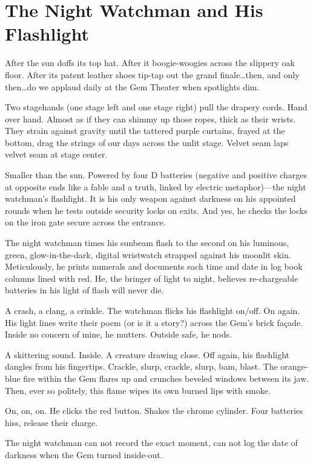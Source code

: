 \documentclass[twoside,10pt]{book}
\begin{document}
\clearpage
\section{The Night Watchman and His Flashlight}

After the sun doffs its top hat. After it boogie-woogies across the
slippery oak floor. After its patent leather shoes tip-tap out the grand
finale\ldots then, and only then\ldots do we applaud daily at the Gem
Theater when spotlights dim.

Two stagehands (one stage left and one stage right) pull the drapery
cords. Hand over hand. Almost as if they can shimmy up those ropes,
thick as their wrists. They strain against gravity until the tattered
purple curtains, frayed at the bottom, drag the strings of our days
across the unlit stage. Velvet seam laps velvet seam at stage center.

Smaller than the sun. Powered by four D batteries (negative and positive
charges at opposite ends like a fable and a truth, linked by electric
metaphor)---the night watchman's flashlight. It is his only weapon
against darkness on his appointed rounds when he tests outside security
locks on exits. And yes, he checks the locks on the iron gate secure
across the entrance.

The night watchman times his sunbeam flash to the second on his
luminous, green, glow-in-the-dark, digital wristwatch strapped against
his moonlit skin. Meticulously, he prints numerals and documents each
time and date in log book columns lined with red. He, the bringer of
light to night, believes re-chargeable batteries in his light of flash
will never die.

A crash, a clang, a crinkle. The watchman flicks his flashlight on/off.
On again. His light lines write their poem (or is it a story?) across
the Gem's brick façade. Inside no concern of mine, he mutters. Outside
safe, he nods.

A skittering sound. Inside. A creature drawing close. Off again, his
flashlight dangles from his fingertips. Crackle, slurp, crackle, slurp,
bam, blast. The orange-blue fire within the Gem flares up and crunches
beveled windows between its jaw. Then, ever so politely, this flame
wipes its own burned lips with smoke.

On, on, on. He clicks the red button. Shakes the chrome cylinder. Four
batteries hiss, release their charge.

The night watchman can not record the exact moment, can not log the date
of darkness when the Gem turned inside-out.
\end{document}
